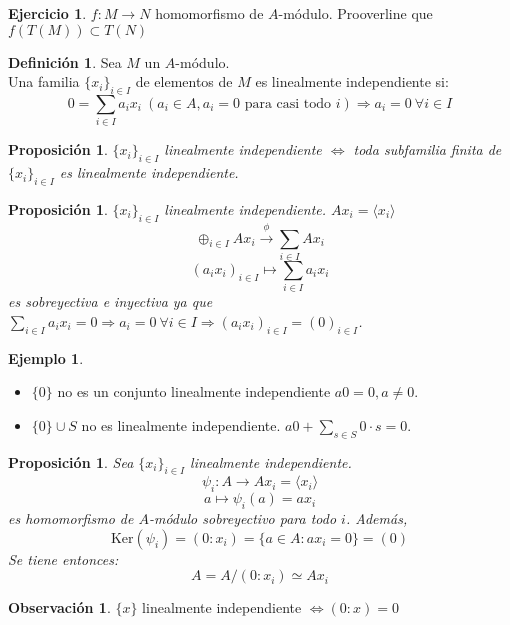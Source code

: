 \documentclass{article}
\theoremstyle{theorem-style}  %
\newtheorem{proposition}[theorem]{Proposición}
\theoremstyle{definition}
\newtheorem{definition}{Definición}[section]
\newtheorem*{observation}{Observación} %
\theoremstyle{example-style}
\newtheorem{example}{Ejemplo}[section]
\newtheorem{exercise}{Ejercicio}[section]
\begin{document}
	\begin{exercise}
		$f: M \longrightarrow N$ homomorfismo de $ A $-módulo. Prooverline que $ f(T(M)) \subset T(N) $
	\end{exercise}
	\begin{definition}
		Sea $ M $ un $ A $-módulo.\\
		Una familia $ \{x_i\}_{i\in I} $ de elementos de $ M $ es linealmente independiente si:
		\[0=\sum_{i\in I}a_i x_i \  (a_i \in A, a_i =0 \text{ para casi todo }i) \Rightarrow a_i =0 \ \forall i\in I \]
	\end{definition}
	\begin{proposition}
		$ \{x_i\}_{i\in I} $ linealmente independiente $ \Leftrightarrow $ toda subfamilia finita de $ \{x_i\}_{i\in I} $ es linealmente independiente.
	\end{proposition}
	\begin{proposition}\label{prop:suma=sumadirecta}
		$ \{x_i\}_{i\in I} $ linealmente independiente.
			$ Ax_i = \langle x_i\rangle$
			\[ \oplus_{i\in I}Ax_i \xrightarrow{\ \phi\ } \sum_{i\in I} A x_i \]
			\[ (a_i x_i)_{i\in I} \longmapsto \sum_{i\in I}a_i x_i \]  es sobreyectiva e inyectiva ya que $\sum_{i\in I}a_i x_i=0\Rightarrow a_i=0 \ \forall i\in I\Rightarrow (a_i x_i)_{i\in I} = (0)_{i\in I}$.
	\end{proposition}

	\begin{example}
		\
		\begin{itemize}
			\item $ \{0\} $ no es un conjunto linealmente independiente $ a0=0, a\neq 0$.
			\item $ \{0\} \cup S$ no es linealmente independiente.	$ a0+\sum_{s\in S}0\cdot s =0 $.
		\end{itemize}
	\end{example}

	\begin{proposition}\label{prop:a=axi}
		Sea $ \{x_i\}_{i\in I} $ linealmente independiente.
		\[ \psi_i:A\longrightarrow Ax_i=\langle x_i\rangle \]
		\[ a\longmapsto \psi_i(a)=ax_i \]
		es homomorfismo de $A$-módulo sobreyectivo para todo $i$. Además,
		\[ \text{Ker}(\psi_i)=(0:x_i)=\{a\in A : ax_i=0\}=(0) \]
		Se tiene entonces:
		\[ A=A/(0:x_i)\simeq Ax_i \]
	\end{proposition}

	\begin{observation}
		$ \{x\} $ linealmente independiente $ \Leftrightarrow (0:x)=0$ 
	\end{observation} 
\end{document}
